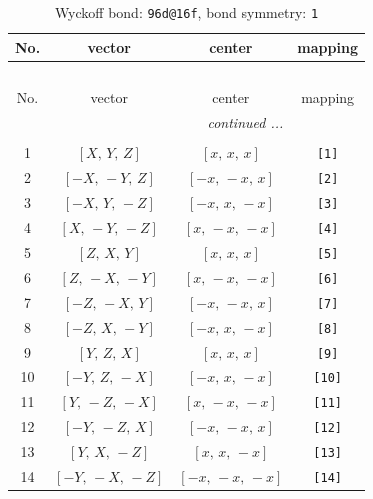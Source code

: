 \documentclass[fleqn,8pt]{jsarticle}
\begin{document}
\begin{longtable}{cccc}
\caption{Wyckoff bond: {\tt 96d@16f}, bond symmetry: {\tt 1}}
 \\
 \hline \hline
No. & vector & center & mapping \\ \hline \endfirsthead

\multicolumn{3}{l}{\tablename\ \thetable{}} \\
 \hline \hline
No. & vector & center & mapping \\ \hline \endhead

 \hline \hline
\multicolumn{3}{r}{\footnotesize\it continued ...} \\ \endfoot

 \hline \hline
\multicolumn{3}{r}{} \\ \endlastfoot

1 & $\left[ X,\, Y,\, Z \right]$ & $\left[ x,\, x,\, x \right]$ & {\tt [1]} \\ \hline
2 & $\left[ - X,\, - Y,\, Z \right]$ & $\left[ - x,\, - x,\, x \right]$ & {\tt [2]} \\ \hline
3 & $\left[ - X,\, Y,\, - Z \right]$ & $\left[ - x,\, x,\, - x \right]$ & {\tt [3]} \\ \hline
4 & $\left[ X,\, - Y,\, - Z \right]$ & $\left[ x,\, - x,\, - x \right]$ & {\tt [4]} \\ \hline
5 & $\left[ Z,\, X,\, Y \right]$ & $\left[ x,\, x,\, x \right]$ & {\tt [5]} \\ \hline
6 & $\left[ Z,\, - X,\, - Y \right]$ & $\left[ x,\, - x,\, - x \right]$ & {\tt [6]} \\ \hline
7 & $\left[ - Z,\, - X,\, Y \right]$ & $\left[ - x,\, - x,\, x \right]$ & {\tt [7]} \\ \hline
8 & $\left[ - Z,\, X,\, - Y \right]$ & $\left[ - x,\, x,\, - x \right]$ & {\tt [8]} \\ \hline
9 & $\left[ Y,\, Z,\, X \right]$ & $\left[ x,\, x,\, x \right]$ & {\tt [9]} \\ \hline
10 & $\left[ - Y,\, Z,\, - X \right]$ & $\left[ - x,\, x,\, - x \right]$ & {\tt [10]} \\ \hline
11 & $\left[ Y,\, - Z,\, - X \right]$ & $\left[ x,\, - x,\, - x \right]$ & {\tt [11]} \\ \hline
12 & $\left[ - Y,\, - Z,\, X \right]$ & $\left[ - x,\, - x,\, x \right]$ & {\tt [12]} \\ \hline
13 & $\left[ Y,\, X,\, - Z \right]$ & $\left[ x,\, x,\, - x \right]$ & {\tt [13]} \\ \hline
14 & $\left[ - Y,\, - X,\, - Z \right]$ & $\left[ - x,\, - x,\, - x \right]$ & {\tt [14]} \\ \hline

\end{longtable}
\end{document}
